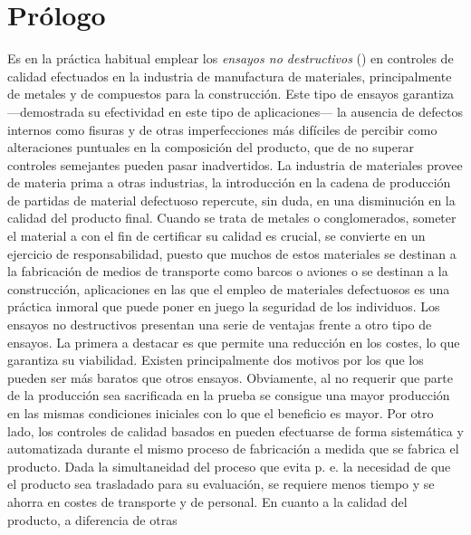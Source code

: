 \chapter{Prólogo}

%

Es en la práctica habitual emplear los \emph{ensayos no destructivos}
() en controles de calidad efectuados en la industria de
manufactura de materiales, principalmente de metales y de compuestos para
la construcción. Este tipo de ensayos garantiza ---demostrada su
efectividad en este tipo de aplicaciones--- la ausencia de defectos
internos como fisuras y de otras imperfecciones más difíciles de percibir
como alteraciones puntuales en la composición del producto, que de no
superar controles semejantes pueden pasar inadvertidos. La industria de
materiales provee de materia prima a otras industrias, la introducción en
la cadena de producción de partidas de material defectuoso repercute, sin
duda, en una disminución en la calidad del producto final. Cuando se trata
de metales o conglomerados, someter el material a  con el fin de
certificar su calidad es crucial, se convierte en un ejercicio de
responsabilidad, puesto que muchos de estos materiales se destinan a la
fabricación de medios de transporte como barcos o aviones o se destinan a
la construcción, aplicaciones en las que el empleo de materiales
defectuosos es una práctica inmoral que puede poner en juego la seguridad
de los individuos. Los ensayos no destructivos presentan una serie de
ventajas frente a otro tipo de ensayos. La primera a destacar es que
permite una reducción en los costes, lo que garantiza su viabilidad.
Existen principalmente dos motivos por los que los  pueden ser más
baratos que otros ensayos. Obviamente, al no requerir que parte de la
producción sea sacrificada en la prueba se consigue una mayor producción en
las mismas condiciones iniciales con lo que el beneficio es mayor. Por otro
lado, los controles de calidad basados en  pueden efectuarse de
forma sistemática y automatizada durante el mismo proceso de fabricación a
medida que se fabrica el producto. Dada la simultaneidad del proceso que
evita p. e. la necesidad de que el producto sea trasladado para su
evaluación, se requiere menos tiempo y se ahorra en costes de transporte y
de personal. En cuanto a la calidad del producto, a diferencia de otras
